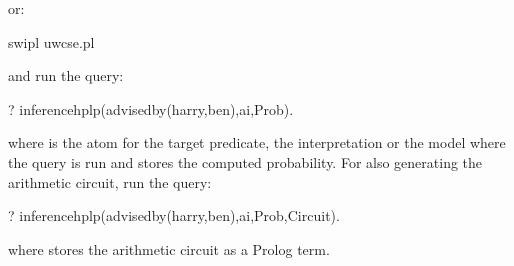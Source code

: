 \documentclass[letterpaper,10pt,english]{sphinxmanual}
\begin{document}
or:

\begin{sphinxVerbatim}[commandchars=\\\{\}]
\PYGZdl{} swipl uwcse.pl
\end{sphinxVerbatim}

and run the query:

\begin{sphinxVerbatim}[commandchars=\\\{\}]
?\PYGZhy{} inference\PYGZus{}hplp(advisedby(harry,ben),ai,Prob).
\end{sphinxVerbatim}

where  is the atom for the target predicate,  the interpretation or the model where the query is run and  stores the computed probability. For also generating the arithmetic circuit, run the query:

\begin{sphinxVerbatim}[commandchars=\\\{\}]
?\PYGZhy{} inference\PYGZus{}hplp(advisedby(harry,ben),ai,Prob,Circuit).
\end{sphinxVerbatim}

where  stores the arithmetic circuit as a Prolog term.
\end{document}
